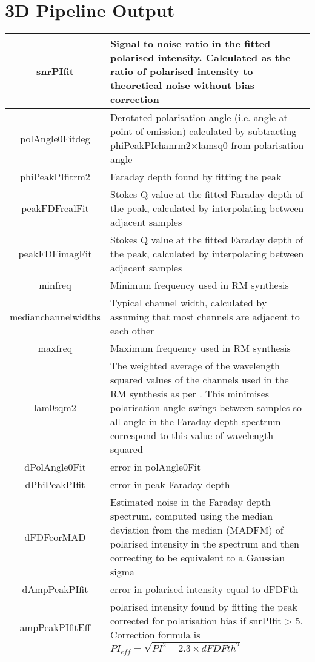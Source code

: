 


\chapter{3D Pipeline Output} %
\label{AppA: 3D pipeline output}

\begin{center}
\begin{tabular}{||c|p{10cm}||} 
 \hline
snrPIfit & Signal to noise ratio in the fitted polarised intensity. Calculated as the ratio of polarised intensity to theoretical noise without bias correction \\ 
\hline
 polAngle0Fitdeg & Derotated polarisation angle (i.e. angle at point of emission) calculated by subtracting phiPeakPIchanrm2$\times$lamsq0 from polarisation angle \\ 
 \hline
 phiPeakPIfitrm2 & Faraday depth found by fitting the peak \\
 \hline
 peakFDFrealFit & Stokes Q value at the fitted Faraday depth of the peak, calculated by interpolating between adjacent samples \\
 \hline
peakFDFimagFit & Stokes Q value at the fitted Faraday depth of the peak, calculated by interpolating between adjacent samples \\
 \hline
minfreq & Minimum frequency used in RM synthesis \\ 
 \hline
 medianchannelwidths & Typical channel width, calculated by assuming that most channels are adjacent to each other \\
 \hline
 maxfreq & Maximum frequency used in RM synthesis \\
 \hline
 lam0sqm2 & The weighted average of the wavelength squared values of the channels used in the RM synthesis as per \cite{Brentjens_2005}. This minimises polarisation angle swings between samples so all angle in the Faraday depth spectrum correspond to this value of wavelength squared \\
 \hline
 dPolAngle0Fit & error in polAngle0Fit \\
 \hline
 dPhiPeakPIfit & error in peak Faraday depth \\
 \hline
 dFDFcorMAD & Estimated noise in the Faraday depth spectrum, computed using the median deviation from the median (MADFM) of polarised intensity in the spectrum and then correcting to be equivalent to a Gaussian sigma \\
 \hline
 dAmpPeakPIfit & error in polarised intensity equal to dFDFth \\
 \hline
 ampPeakPIfitEff & polarised intensity found by fitting the peak corrected for polarisation bias if snrPIfit > 5. Correction formula is $PI_{eff} = \sqrt{PI^2 - 2.3\times dFDFth^2}$ \\
 \hline
\end{tabular}
\end{center}